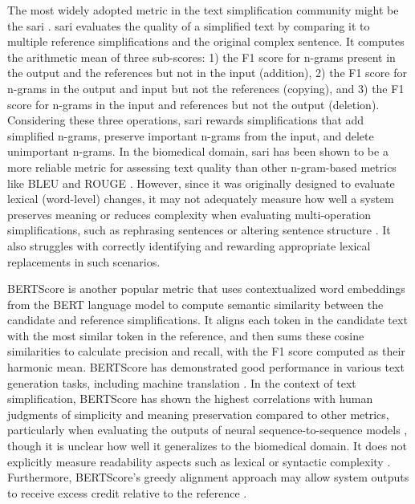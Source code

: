 The most widely adopted metric in the text simplification community might be the \gls{sari} \cite{xu-etal-2016-optimizing}. 
\gls{sari} evaluates the quality of a simplified text by comparing it to multiple reference simplifications and the original complex sentence. 
It computes the arithmetic mean of three sub-scores: 1) the F1 score for n-grams present in the output and the references but not in the input (addition), 2) the F1 score for n-grams in the output and input but not the references (copying), and 3) the F1 score for n-grams in the input and references but not the output (deletion). 
Considering these three operations, \gls{sari} rewards simplifications that add simplified n-grams, preserve important n-grams from the input, and delete unimportant n-grams. 
In the biomedical domain, \gls{sari} has been shown to be a more reliable metric for assessing text quality than other n-gram-based metrics like BLEU and ROUGE \cite{li2024largelanguagemodelsbiomedical}.
However, since it was originally designed to evaluate lexical (word-level) changes, it may not adequately measure how well a system preserves meaning or reduces complexity when evaluating multi-operation simplifications, such as rephrasing sentences or altering sentence structure \cite{alva-manchego-etal-2021-un}.
It also struggles with correctly identifying and rewarding appropriate lexical replacements in such scenarios.

BERTScore \cite{zhang2020bertscoreevaluatingtextgeneration} is another popular metric that uses contextualized word embeddings from the BERT language model to compute semantic similarity between the candidate and reference simplifications. 
It aligns each token in the candidate text with the most similar token in the reference, and then sums these cosine similarities to calculate precision and recall, with the F1 score computed as their harmonic mean. 
BERTScore has demonstrated good performance in various text generation tasks, including machine translation \cite{Vetrov2022ANA, Tang2024ImprovingBF}. 
In the context of text simplification, BERTScore has shown the highest correlations with human judgments of simplicity and meaning preservation compared to other metrics, particularly when evaluating the outputs of neural sequence-to-sequence models \cite{alva-manchego-etal-2021-un}, though it is unclear how well it generalizes to the biomedical domain. 
It does not explicitly measure readability aspects such as lexical or syntactic complexity \cite{li2024largelanguagemodelsbiomedical}. 
Furthermore, BERTScore's greedy alignment approach may allow system outputs to receive excess credit relative to the reference \cite{jin-gildea-2022-rewarding}.

